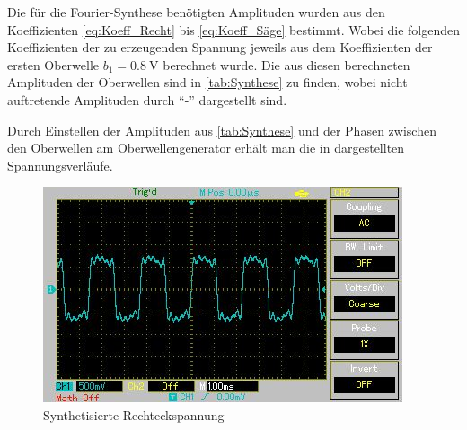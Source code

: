 Die für die Fourier-Synthese benötigten Amplituden wurden aus den Koeffizienten \cref{eq:Koeff_Recht} bis \cref{eq:Koeff_Säge}
bestimmt. Wobei die folgenden Koeffizienten der zu erzeugenden Spannung jeweils aus 
dem Koeffizienten der ersten Oberwelle $b_{1} = \SI{0.8}{\volt}$
berechnet wurde. 
%
Die aus diesen berechneten Amplituden der Oberwellen sind in \cref{tab:Synthese} zu finden, wobei nicht auftretende
Amplituden durch \enquote{-} dargestellt sind. 

  

Durch Einstellen der Amplituden aus \cref{tab:Synthese} und der Phasen zwischen den Oberwellen am Oberwellengenerator
erhält man die in  dargestellten Spannungsverläufe.

\begin{figure}[h!]
	\centering
	\includegraphics[scale=0.8]{Grafiken/Rechteckspannung.jpg}
	\caption{Synthetisierte Rechteckspannung}
	\label{fig:Recht}
\end{figure}

